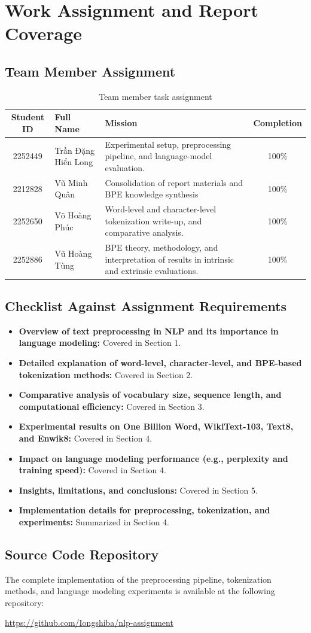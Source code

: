 \section*{Work Assignment and Report Coverage}

\subsection*{Team Member Assignment}
\begin{table}[h!]
\centering
\renewcommand{\arraystretch}{1.2}
\begin{tabular}{|c|l|p{8.0cm}|c|}
\hline
\textbf{Student ID} & \textbf{Full Name} & \textbf{Mission} & \textbf{Completion} \\ \hline
2252449 & Trần Đặng Hiển Long & Experimental setup, preprocessing pipeline, and language-model evaluation. & 100\% \\ \hline
2212828 & Vũ Minh Quân & Consolidation of report materials and BPE knowledge synthesis& 100\% \\ \hline
2252650 & Võ Hoàng Phúc & Word-level and character-level tokenization write-up, and comparative analysis. & 100\% \\ \hline
2252886 & Vũ Hoàng Tùng & BPE theory, methodology, and interpretation of results in intrinsic and extrinsic evaluations. & 100\% \\ \hline
\end{tabular}
\caption{Team member task assignment}
\end{table}

\subsection*{Checklist Against Assignment Requirements}
\begin{itemize}
    \item \textbf{Overview of text preprocessing in NLP and its importance in language modeling:} Covered in Section 1.
    \item \textbf{Detailed explanation of word-level, character-level, and BPE-based tokenization methods:} Covered in Section 2.
    \item \textbf{Comparative analysis of vocabulary size, sequence length, and computational efficiency:} Covered in Section 3.
    \item \textbf{Experimental results on One Billion Word, WikiText-103, Text8, and Enwik8:} Covered in Section 4.
    \item \textbf{Impact on language modeling performance (e.g., perplexity and training speed):} Covered in Section 4.
    \item \textbf{Insights, limitations, and conclusions:} Covered in Section 5.
    \item \textbf{Implementation details for preprocessing, tokenization, and experiments:} Summarized in Section 4.
\end{itemize}

\subsection*{Source Code Repository}
The complete implementation of the preprocessing pipeline, tokenization methods, and language modeling experiments is available at the following repository:
\begin{center}
    \url{https://github.com/Iongshiba/nlp-assignment}
\end{center}
